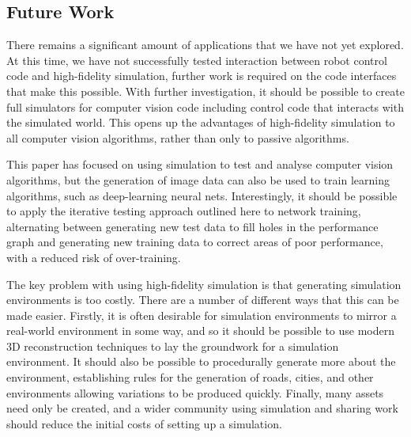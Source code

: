 \documentclass[letterpaper, 10 pt, conference]{ieeeconf}  %
\begin{document}
\subsection{Future Work}

There remains a significant amount of applications that we have not yet explored. At this time, we have not successfully tested interaction between robot control code and high-fidelity simulation, further work is required on the code interfaces that make this possible. With further investigation, it should be possible to create full simulators for computer vision code including control code that interacts with the simulated world. This opens up the advantages of high-fidelity simulation to all computer vision algorithms, rather than only to passive algorithms.

This paper has focused on using simulation to test and analyse computer vision algorithms, but the generation of image data can also be used to train learning algorithms, such as deep-learning neural nets. Interestingly, it should be possible to apply the iterative testing approach outlined here to network training, alternating between generating new test data to fill holes in the performance graph and generating new training data to correct areas of poor performance, with a reduced risk of over-training.

The key problem with using high-fidelity simulation is that generating simulation environments is too costly. There are a number of different ways that this can be made easier. Firstly, it is often desirable for simulation environments to mirror a real-world environment in some way, and so it should be possible to use modern 3D reconstruction techniques to lay the groundwork for a simulation environment. It should also be possible to procedurally generate more about the environment, establishing rules for the generation of roads, cities, and other environments allowing variations to be produced quickly. Finally, many assets need only be created, and a wider community using simulation and sharing work should reduce the initial costs of setting up a simulation.

\addtolength{\textheight}{-12cm}   %
\end{document}
